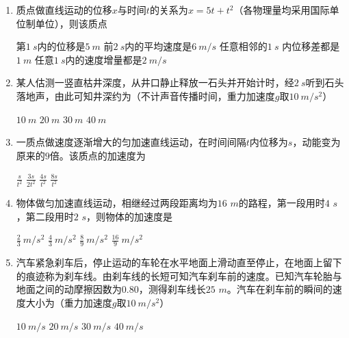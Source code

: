 \begin{enumerate}
\renewcommand{\labelenumi}{\arabic{enumi}.}
\item
{}
质点做直线运动的位移$ x $与时间$ t $的关系为$ x=5t+t^{2} $（各物理量均采用国际单位制单位），则该质点  


\fourchoices
{第$ 1 \ s $内的位移是$ 5 \ m $ }
{前$ 2 \ s $内的平均速度是$ 6 \ m/s $}
{任意相邻的$ 1 \ s $ 内位移差都是$ 1 \ m $}
{任意$ 1 \ s $内的速度增量都是$ 2 \ m/s $}



\item 
{}
某人估测一竖直枯井深度，从井口静止释放一石头并开始计时，经$ 2 \ s $听到石头落地声，由此可知井深约为（不计声音传播时间，重力加速度$ g $取$ 10 \ m/s ^{2} $）  


\fourchoices
{$ 10 \ m $ }
{$ 20\ m $}
{$ 30\ m $ }
{$ 40\ m $}


\item 
{}
一质点做速度逐渐增大的匀加速直线运动，在时间间隔$ t $内位移为$ s $，动能变为原来的$ 9 $倍。该质点的加速度为  

\fourchoices
{$ \frac { s } { t ^ { 2 } } $}
{$ \frac { 3 s } { 2 t ^ { 2 } } $}
{$ \frac { 4 s } { t ^ { 2 } } $ }
{$ \frac { 8 s } { t ^ { 2 } } $}


\item 
{}
物体做匀加速直线运动，相继经过两段距离均为$ 16 $ $ m $的路程，第一段用时$ 4 $ $ s $，第二段用时$ 2 $ $ s $，则物体的加速度是  

\fourchoices
{$ \frac{ 2 }{ 3 } \ m/s^{2} $}
{$ \frac{ 4 }{ 3 } \ m/s^{2} $}
{$ \frac{ 8 }{ 9 } \ m/s^{2} $}
{$ \frac{16}{9}\ m/s^{2} $}





\item 
{}
汽车紧急刹车后，停止运动的车轮在水平地面上滑动直至停止，在地面上留下的痕迹称为刹车线。由刹车线的长短可知汽车刹车前的速度。已知汽车轮胎与地面之间的动摩擦因数为$ 0.80 $，测得刹车线长$ 25 $ $ m $。汽车在刹车前的瞬间的速度大小为（重力加速度$ g $取$ 10 \ m/s ^{2} $）  


\fourchoices
{$ 10 \ m/s $ }
{$ 20 \ m/s $}
{$ 30 \ m/s $ }
{$ 40 \ m/s $}



\end{enumerate}
